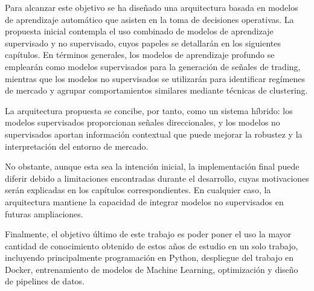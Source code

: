 Para alcanzar este objetivo se ha diseñado una arquitectura basada en modelos de aprendizaje automático que asisten en la toma de decisiones
operativas. La propuesta inicial contempla el uso combinado de modelos de aprendizaje supervisado y no supervisado, cuyos papeles se detallarán en los
siguientes capítulos. En términos generales, los modelos de aprendizaje profundo se emplearán como modelos supervisados para la generación de señales
de trading, mientras que los modelos no supervisados se utilizarán para identificar regímenes de mercado y agrupar comportamientos similares mediante
técnicas de clustering.

La arquitectura propuesta se concibe, por tanto, como un sistema híbrido: los modelos supervisados proporcionan señales direccionales, y los modelos
no supervisados aportan información contextual que puede mejorar la robustez y la interpretación del entorno de mercado.

No obstante, aunque esta sea la intención inicial, la implementación final puede diferir debido a limitaciones encontradas durante el desarrollo, cuyas
motivaciones serán explicadas en los capítulos correspondientes. En cualquier caso, la arquitectura mantiene la capacidad de integrar modelos no
supervisados en futuras ampliaciones.

Finalmente, el objetivo último de este trabajo es poder poner el uso la mayor cantidad de conocimiento obtenido de estos años de estudio en un solo
trabajo, incluyendo principalmente programación en Python, despliegue del trabajo en Docker, entrenamiento de modelos de Machine Learning,
optimización y diseño de pipelines de datos.
